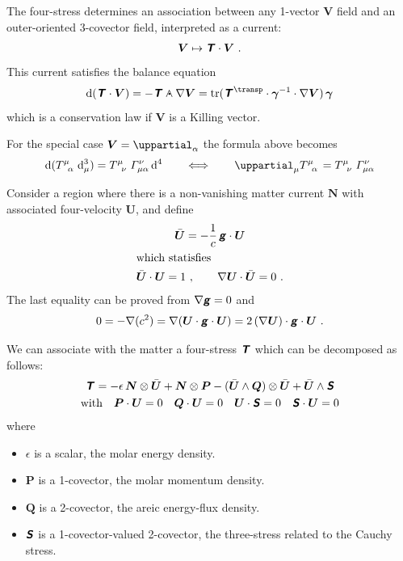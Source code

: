 \documentclass[\ifafour a4paper,12pt,\else a5paper,10pt,\fi%
onecolumn,oneside,article,%
british%
]{memoir}
\theoremstyle{remark}
\theoremstyle{innote}
\newcommand*{\mathte}[1]{\textbf{\textit{\textsf{#1}}}}
\newcommand*{\de}{\uppartial}%
\newcommand*{\di}{\mathrm{d}}%
\DeclareMathOperator{\tr}{tr}%
\renewcommand*{\|}[1][]{\nonscript\:#1\vert\nonscript\:\mathopen{}}
\newcommand*{\T}{^\transp}%
\renewcommand*{\i}{\indices}
\newcommand*{\dand}{\mathbin{\mathclap{\mkern12.5mu\bm{\cdot}}\wedge}}
\newcommand*{\se}[1]{\de_{#1}}
\newcommand*{\ttti}[1]{\di^{3}_{#1}}
\newcommand*{\tttti}[1]{\di^{4}_{#1}}
\newcommand*{\yg}{\mathte{g}}
\newcommand*{\ve}{\bm{\gamma}}
\newcommand*{\vi}{\bm{\gamma}^{-1}}
\newcommand*{\yN}{\bm{N}}
\newcommand*{\yP}{\bm{P}}
\newcommand*{\yQ}{\bm{Q}}
\newcommand*{\yS}{\mathte{S}}
\newcommand*{\yT}{\mathte{T}}
\newcommand*{\yU}{\bm{U}}
\newcommand*{\yUd}{\bar{\bm{U}}}
\newcommand*{\yV}{\bm{V}}
\begin{document}
The four-stress determines an association between any 1-vector $\yV$ field and an outer-oriented 3-covector field, interpreted as a current:
\begin{equation}
  \label{eq:1vec_to_current_T}
  \yV \mapsto
  \yT \cdot \yV \ .
\end{equation}
This current satisfies the balance equation
\begin{equation}
  \label{eq:balance_VT_current}
  \di(\yT\cdot\yV) = -\yT \dand \nabla\yV = \tr(\yT\T\cdot\vi\cdot\nabla\yV)\,\ve
\end{equation}
which is a conservation law if $\yV$ is a Killing vector.

For the special case $\yV=\se{\alpha}$ the formula above becomes
\begin{equation}
  \label{eq:balance_VT_current_coord}
  \di(T\i{^{\mu}_{\alpha}}\,\ttti{\mu}) = T\i{^{\mu}_{\nu}}\,\varGamma^{\nu}_{\mu\alpha}\,\tttti{}
  \qquad\Longleftrightarrow\qquad
  \de_{\mu}T\i{^{\mu}_{\alpha}} = T\i{^{\mu}_{\nu}}\,\varGamma^{\nu}_{\mu\alpha}
\end{equation}

\medskip

Consider a region where there is a non-vanishing matter current $\yN$ with associated four-velocity $\yU$, and define
\begin{gather}
  \label{eq:U_dual}
  \yUd = -\frac{1}{c}\,\yg \cdot \yU
  \\
  \shortintertext{which statisfies}
  \yUd \cdot \yU = 1 \ ,
  \qquad
  \nabla\yU \cdot \yUd = 0 \ .
\end{gather}
The last equality can be proved from $\nabla\yg=0$ and 
\begin{equation}
  \label{eq:proof_UU_nabla}
  0=-\nabla(c^{2}) = \nabla(\yU \cdot \yg \cdot \yU) = 2\,(\nabla\yU) \cdot \yg \cdot \yU \ .
\end{equation}

\medskip


We can associate with the matter a four-stress $\yT$ which can be decomposed as follows:
\begin{equation}
  \label{eq:4stress_matter}
  \begin{gathered}
    \yT =
    -\epsilon\,\yN \otimes \yUd
    + \yN \otimes \yP
    -(\yUd\land \yQ)\otimes\yUd
    +\yUd \land \yS
    \\
    \text{with}\quad
    \yP \cdot\yU = 0
    \quad
    \yQ \cdot \yU = 0
    \quad
    \yU\cdot\yS = 0
    \quad
    \yS \cdot \yU= 0
  \end{gathered}
\end{equation}
where
\begin{itemize}
\item $\epsilon$ is a scalar, the molar energy density.
\item $\yP$ is a 1-covector, the molar momentum density.
\item $\yQ$ is a 2-covector, the areic energy-flux density.
\item $\yS$ is a 1-covector-valued 2-covector, the three-stress related to the Cauchy stress.
\end{itemize}
\end{document}
